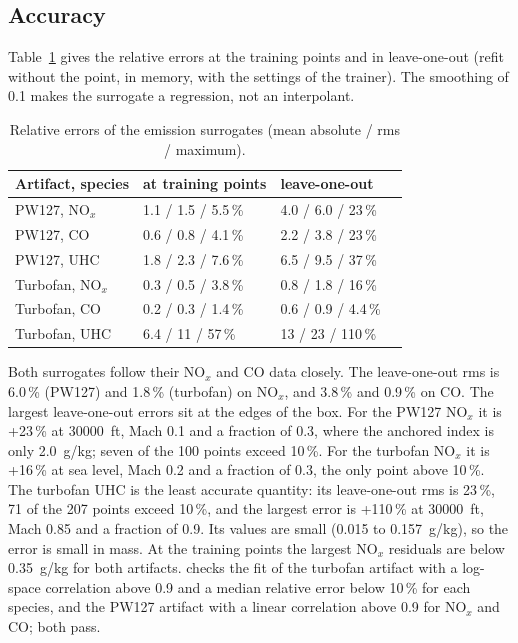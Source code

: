 \documentclass[a4paper,11pt]{article}
\begin{document}
\subsection{Accuracy}
Table~\ref{tab:em-fit} gives the relative errors at the training points and in leave-one-out
(refit without the point, in memory, with the settings of the trainer). The smoothing of 0.1
makes the surrogate a regression, not an interpolant.

\begin{table}[htbp]
\centering\small
\caption{Relative errors of the emission surrogates (mean absolute / rms / maximum).}\label{tab:em-fit}
\begin{tabular}{@{}llll@{}}
\toprule
Artifact, species & at training points & leave-one-out \\
\midrule
PW127, NO$_x$ & 1.1 / 1.5 / 5.5\,\% & 4.0 / 6.0 / 23\,\% \\
PW127, CO & 0.6 / 0.8 / 4.1\,\% & 2.2 / 3.8 / 23\,\% \\
PW127, UHC & 1.8 / 2.3 / 7.6\,\% & 6.5 / 9.5 / 37\,\% \\
Turbofan, NO$_x$ & 0.3 / 0.5 / 3.8\,\% & 0.8 / 1.8 / 16\,\% \\
Turbofan, CO & 0.2 / 0.3 / 1.4\,\% & 0.6 / 0.9 / 4.4\,\% \\
Turbofan, UHC & 6.4 / 11 / 57\,\% & 13 / 23 / 110\,\% \\
\bottomrule
\end{tabular}
\end{table}

Both surrogates follow their NO$_x$ and CO data closely. The leave-one-out rms is 6.0\,\% (PW127)
and 1.8\,\% (turbofan) on NO$_x$, and 3.8\,\% and 0.9\,\% on CO. The largest leave-one-out errors
sit at the edges of the box. For the PW127 NO$_x$ it is +23\,\% at \SI{30000}{ft}, Mach 0.1 and a
fraction of 0.3, where the anchored index is only \SI{2.0}{g/kg}; seven of the 100 points exceed
10\,\%. For the turbofan NO$_x$ it is +16\,\% at sea level, Mach 0.2 and a fraction of 0.3, the
only point above 10\,\%. The turbofan UHC is the least accurate quantity: its leave-one-out rms
is 23\,\%, 71 of the 207 points exceed 10\,\%, and the largest error is +110\,\% at
\SI{30000}{ft}, Mach 0.85 and a fraction of 0.9. Its values are small (0.015 to
\SI{0.157}{g/kg}), so the error is small in mass. At the training points the largest NO$_x$
residuals are below \SI{0.35}{g/kg} for both artifacts. 
checks the fit of the turbofan artifact with a log-space correlation above 0.9 and a median
relative error below 10\,\% for each species, and the PW127 artifact with a linear correlation
above 0.9 for NO$_x$ and CO; both pass.
\end{document}
